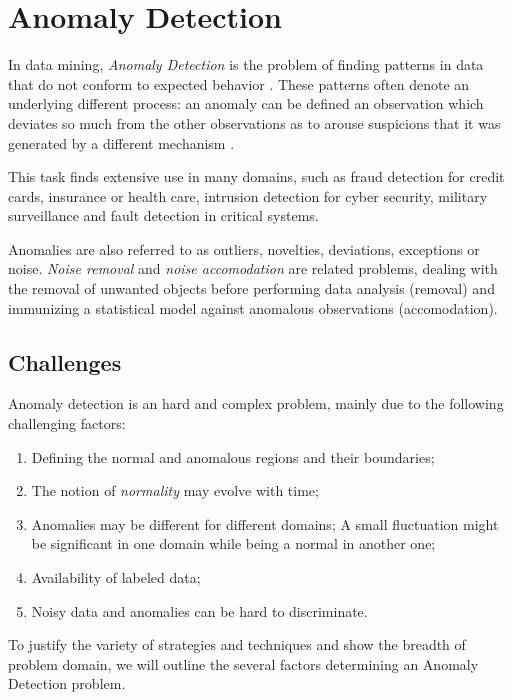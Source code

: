 \section{Anomaly Detection}

In data mining, \textit{Anomaly Detection} is the problem of finding patterns in data that do not conform to expected behavior \cite{chandola2009anomaly}. These patterns often denote an underlying different process: an anomaly can be defined an observation which deviates so much from the other observations as to arouse suspicions that it was generated by a different mechanism \cite{hawkins1980identification}.

This task finds extensive use in many domains, such as fraud detection for credit cards, insurance or health care, intrusion detection for cyber security, military surveillance and fault detection in critical systems.

Anomalies are also referred to as outliers, novelties, deviations, exceptions or noise. \textit{Noise removal} and \textit{noise accomodation} are related problems, dealing with the removal of unwanted objects before performing data analysis (removal) and immunizing a statistical model against anomalous observations (accomodation).

\subsection{Challenges}

Anomaly detection is an hard and complex problem, mainly due to the following challenging factors:

\begin{enumerate}
	\item Defining the normal and anomalous regions and their boundaries;
	\item The notion of \textit{normality} may evolve with time;
	\item Anomalies may be different for different domains; A small fluctuation might be significant in one domain while being a normal in another one;
	\item Availability of labeled data;
	\item Noisy data and anomalies can be hard to discriminate.
\end{enumerate}

To justify the variety of strategies and techniques and show the breadth of problem domain, we will outline the several factors determining an Anomaly Detection problem.

